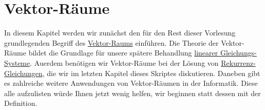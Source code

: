 \chapter{Vektor-R\"{a}ume}
In diesem Kapitel werden wir zun\"{a}chst den f\"{u}r den Rest dieser Vorlesung grundlegenden
Begriff des \href{https://de.wikipedia.org/wiki/Vektorraum}{Vektor-Raums}
einf\"{u}hren.  Die Theorie der Vektor-R\"{a}ume bildet die Grundlage f\"{u}r unsere sp\"{a}tere
Behandlung \href{https://de.wikipedia.org/wiki/Lineares_Gleichungssystem}{linearer Gleichungs-Systeme}. 
Au\3erdem ben\"{o}tigen wir Vektor-R\"{a}ume bei der L\"{o}sung von
\href{https://en.wikipedia.org/wiki/Recurrence_relation}{Rekurrenz-Gleichungen}, die wir im letzten  
Kapitel dieses Skriptes diskutieren.  Daneben gibt es zahlreiche weitere Anwendungen von Vektor-R\"{a}umen in der
Informatik.  Diese alle aufzulisten w\"{u}rde Ihnen jetzt wenig helfen, wir beginnen statt dessen mit
der Definition. 

\renewcommand{\labelenumi}{\arabic{enumi}.}
\renewcommand{\labelenumii}{(\alph{enumii})}

